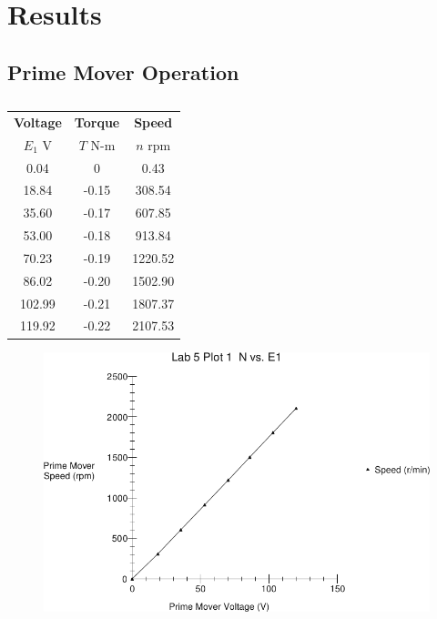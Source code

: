 \documentclass{article}
\begin{document}
\section{Results}

\subsection{Prime Mover Operation}
\begin{table}[H]
  \centering
  \begin{tabular}{*{3}{c}}
    \textbf{Voltage} & \textbf{Torque} & \textbf{Speed} \\
    $E_1$ V          & $T$ N-m         & $n$ rpm \\

    \hline

      0.04 &     0 &    0.43 \\
     18.84 & -0.15 &  308.54 \\
     35.60 & -0.17 &  607.85 \\
     53.00 & -0.18 &  913.84 \\
     70.23 & -0.19 & 1220.52 \\
     86.02 & -0.20 & 1502.90 \\
    102.99 & -0.21 & 1807.37 \\
    119.92 & -0.22 & 2107.53 \\
  \end{tabular}
  \caption{}
  \label{}
\end{table}

\begin{figure}[H]
  \centering
  \includegraphics[width=\textwidth]{img/plot1}
  \caption{}
  \label{}
\end{figure}
\end{document}
